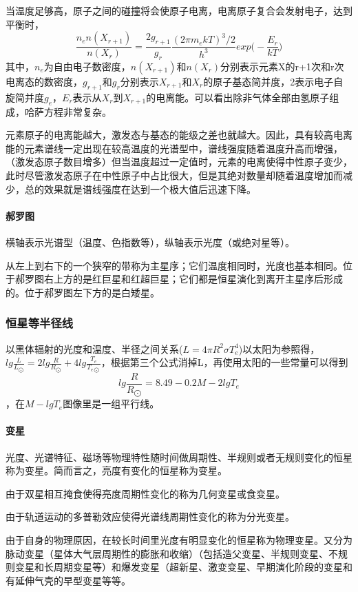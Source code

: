 \documentclass[%
 reprint,
 amsmath,amssymb,
 aps,
]{revtex4-1}
\begin{document}
当温度足够高，原子之间的碰撞将会使原子电离，电离原子复合会发射电子，达到平衡时，
$$\frac{n_e n(X_{r+1})}{n(X_r)} = \frac{2g_{r+1}}{g_r} \frac{(2\pi m_e k T)^3/2}{h^3} exp\big(- \frac{E_r}{kT}\big) $$
其中，$n_e$为自由电子数密度，$n(X_{r+1})$和$n(X_r)$分别表示元素X的r+1次和r次电离态的数密度，$g_{r+1}$和$g_r$分别表示$X_{r+1}$和$X_r$的原子基态简并度，2表示电子自旋简并度$g_e$，$E_r$表示从$X_r$到$X_{r+1}$的电离能。可以看出除非气体全部由氢原子组成，哈萨方程非常复杂。

元素原子的电离能越大，激发态与基态的能级之差也就越大。因此，具有较高电离能的元素谱线一定出现在较高温度的光谱型中，谱线强度随着温度升高而增强，（激发态原子数目增多）但当温度超过一定值时，元素的电离使得中性原子变少，此时尽管激发态原子在中性原子中占比很大，但是其绝对数量却随着温度增加而减少，总的效果就是谱线强度在达到一个极大值后迅速下降。

\paragraph{郝罗图}横轴表示光谱型（温度、色指数等），纵轴表示光度（或绝对星等）。

从左上到右下的一个狭窄的带称为主星序；它们温度相同时，光度也基本相同。位于郝罗图右上方的是红巨星和红超巨星；它们都是恒星演化到离开主星序后形成的。位于郝罗图左下方的是白矮星。

\subsubsection{恒星等半径线}以黑体辐射的光度和温度、半径之间关系($L = 4\pi R^2 \sigma T_e^4$)以太阳为参照得，$lg\frac{L}{L_{\bigodot}} = 2lg\frac{R}{R_{\bigodot}} + 4lg\frac{T_e}{T_{e\bigodot}}$，根据第三个公式消掉L，再使用太阳的一些常量可以得到$$lg\frac{R}{R_{\bigodot}} = 8.49 - 0.2M - 2lgT_e$$，在$M-lgT_e$图像里是一组平行线。

\paragraph{变星}光度、光谱特征、磁场等物理特性随时间做周期性、半规则或者无规则变化的恒星称为变星。简而言之，亮度有变化的恒星称为变星。

由于双星相互掩食使得亮度周期性变化的称为几何变星或食变星。

由于轨道运动的多普勒效应使得光谱线周期性变化的称为分光变星。

由于自身的物理原因，在较长时间里光度有明显变化的恒星称为物理变星。又分为脉动变星（星体大气层周期性的膨胀和收缩）（包括造父变星、半规则变星、不规则变星和长周期变星等）和爆发变星（超新星、激变变星、早期演化阶段的变星和有延伸气壳的早型变星等等。
\end{document}
